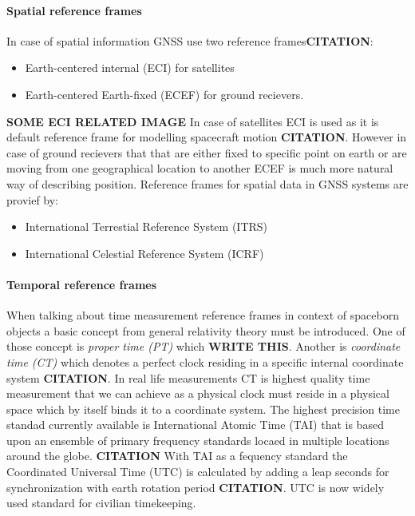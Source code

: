 \paragraph{Spatial reference frames}
In case of spatial information GNSS use two reference frames\textbf{CITATION}:
\begin{itemize}
	\item Earth-centered internal (ECI) for satellites
	\item Earth-centered Earth-fixed (ECEF) for ground recievers.
\end{itemize}
\textbf{SOME ECI RELATED IMAGE}
In case of satellites ECI is used as it is default reference frame for modelling spacecraft
motion \textbf{CITATION}. However in case of ground recievers that that are either fixed to 
specific point on earth or are moving from one geographical location to another ECEF is much
more natural way of describing position.
Reference frames for spatial data in GNSS systems are provief by:
\begin{itemize}
	\item International Terrestial Reference System (ITRS)
	\item International Celestial Reference System (ICRF)
\end{itemize}

\paragraph{Temporal reference frames}
When talking about time measurement reference frames in context of spaceborn objects a basic
concept from general relativity theory must be introduced.
One of those concept is \emph{proper time (PT)} which \textbf{WRITE THIS}.
Another is \emph{coordinate time (CT)} which denotes a perfect clock residing in a specific 
internal coordinate system \textbf{CITATION}.
In real life measurements CT is highest quality time measurement that we can achieve as a 
physical clock must reside in a physical space which by itself binds it to a coordinate system.
The highest precision time standad currently available is International Atomic Time (TAI)
that is based upon an ensemble of primary frequency standards locaed in multiple locations
around the globe. \textbf{CITATION} With TAI as a fequency standard the Coordinated Universal
Time (UTC) is calculated by adding a leap seconds for synchronization with earth rotation
period \textbf{CITATION}. UTC is now widely used standard for civilian timekeeping.

